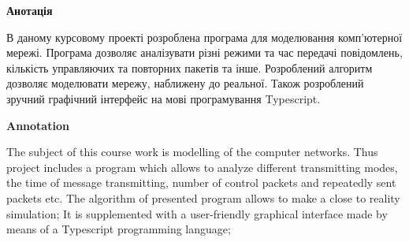 \newpage
{}
\begin{center}
\textbf {Анотація}
\end{center} 

В даному курсовому проекті розроблена програма для моделювання комп'ютерної мережі.
Програма дозволяє аналізувати різні режими та час передачі повідомлень, кількість управляючих та повторних пакетів та інше.
Розроблений алгоритм дозволяє моделювати мережу, наближену до реальної.
Також розроблений зручний графічний інтерфейс на мові програмування Typescript.

\newpage
{}
\begin{center}
\textbf {Annotation}
\end{center} 

The subject of this course work is modelling of the computer networks.
Thus project includes a program which allows to analyze different transmitting modes, the time of message transmitting, number of control packets and repeatedly sent packets etc.
The algorithm of presented program allows to make a close to reality simulation;
It is supplemented with a user-friendly graphical interface made by means of a Typescript programming language;
\restoregeometry
\newpage
{}

